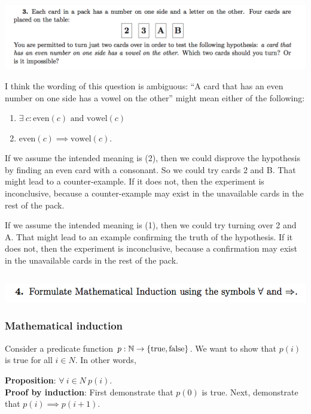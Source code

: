 \documentclass[12pt]{article}
\begin{document}
\subsection*{}
\includegraphics[width=450pt]{img/iulm-2-3.png}
\begin{mdframed}
  I think the wording of this question is ambiguous: ``A card that has an even
  number on one side has a vowel on the other'' might mean either of the
  following:
\begin{enumerate}
\item $\exists ~ c: \text{even}(c) \text{~and~} \text{vowel}(c)$
\item $\text{even}(c) \implies \text{vowel}(c)$.
\end{enumerate}
If we assume the intended meaning is (2), then we could disprove the hypothesis
by finding an even card with a consonant. So we could try cards 2 and B. That
might lead to a counter-example. If it does not, then the experiment is
inconclusive, because a counter-example may exist in the unavailable cards in
the rest of the pack.

If we assume the intended meaning is (1), then we could try turning over 2 and
A. That might lead to an example confirming the truth of the hypothesis. If it
does not, then the experiment is inconclusive, because a confirmation may exist
in the unavailable cards in the rest of the pack.
\end{mdframed}

\subsection*{}
\includegraphics[width=400pt]{img/iulm-2-4.png}
\begin{mdframed}
\subsubsection*{Mathematical induction}
Consider a predicate function $p: \mathbb{N} \to \{\text{true},\text{false}\}$. We want to show
that $p(i)$ is true for all $i \in N$. In other words,

\textbf{Proposition}: $\forall ~ i \in N ~ p(i)$.\\

\textbf{Proof by induction}: First demonstrate that $p(0)$ is true. Next,
demonstrate that $p(i) \implies p(i+1)$.

\end{mdframed}
\end{document}
